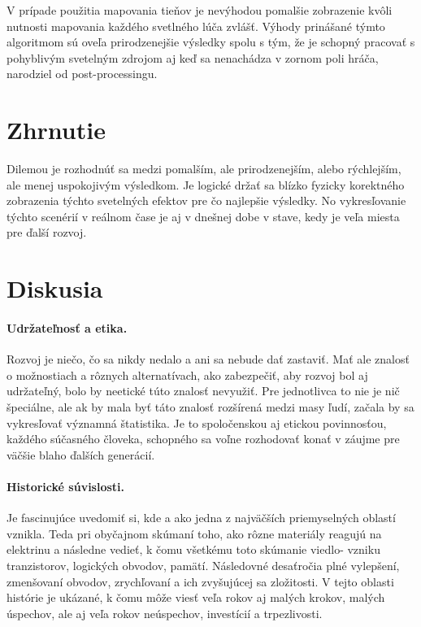 \documentclass[10pt,twoside,slovak,a4paper]{article}
\begin{document}
V prípade použitia mapovania tieňov je nevýhodou pomalšie zobrazenie kvôli nutnosti 
mapovania každého svetlného lúča zvlášť. Výhody prinášané týmto algoritmom sú oveľa 
prirodzenejšie výsledky spolu s tým, že je schopný pracovať s pohyblivým svetelným 
zdrojom aj keď sa nenachádza v zornom poli hráča, narodziel od post-processingu.

\section{Zhrnutie} 
\label{zhr}
Dilemou je rozhodnúť sa medzi pomalším, ale prirodzenejším, alebo rýchlejším, ale 
menej uspokojivým výsledkom. Je logické držať sa blízko fyzicky korektného zobrazenia 
týchto svetelných efektov pre čo najlepšie výsledky. No vykresľovanie týchto scenérií 
v reálnom čase je aj v dnešnej dobe v stave, kedy je veľa miesta pre ďalší rozvoj.


\section{Diskusia} 
\label{dsk}
\paragraph{Udržateľnosť a etika.} Rozvoj je niečo, čo sa nikdy nedalo a ani sa nebude dať 
zastaviť. Mať ale znalosť o možnostiach a rôznych alternatívach, ako zabezpečiť, aby rozvoj 
bol aj udržateľný, bolo by neetické túto znalosť nevyužiť. Pre jednotlivca to nie je nič 
špeciálne, ale ak by mala byť táto znalosť rozšírená medzi masy ľudí, začala by sa 
vykresľovať významná štatistika. Je to spoločenskou aj etickou povinnosťou, každého 
súčasného človeka, schopného sa voľne rozhodovať konať v záujme pre väčšie blaho ďalších 
generácií.

\paragraph{Historické súvislosti.} Je fascinujúce uvedomiť si, kde a ako jedna z najväčších 
priemyselných oblastí vznikla. Teda pri obyčajnom skúmaní toho, ako rôzne  materiály reagujú 
na elektrinu a následne vedieť, k čomu všetkému toto skúmanie viedlo- vzniku tranzistorov, 
logických obvodov, pamätí. Následovné desaťročia plné vylepšení, zmenšovaní obvodov, 
zrychľovaní a ich zvyšujúcej sa zložitosti. V tejto oblasti histórie je ukázané, k čomu môže 
viesť veľa rokov aj malých krokov, malých úspechov, ale aj veľa rokov neúspechov, investícií 
a trpezlivosti.
\end{document}
